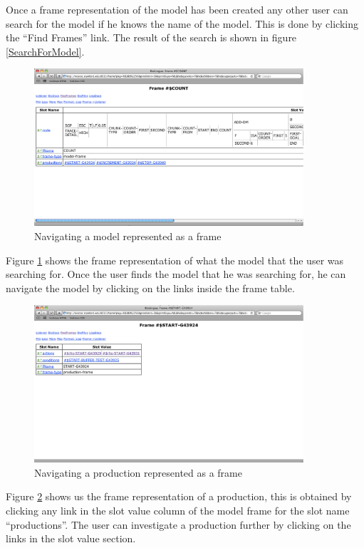 Once a frame representation of the model has been created any other
user can search for the model if he knows the name of the model. This
is done by clicking the ``Find Frames'' link. The result of the search
is shown in figure \ref{SearchForModel}.

\begin{figure}[htp]
  \centering
  \includegraphics[width=100mm]{NavigateFrame}
  \caption{Navigating a model represented as a frame}
  \label{NavigateFrame}
\end{figure}

Figure \ref{NavigateFrame} shows the frame representation of what the
model that the user was searching for. Once the user finds the model
that he was searching for, he can navigate the model by clicking on
the links inside the frame table.

\begin{figure}[htp]
  \centering
  \includegraphics[width=100mm]{NavigatingAProduction}
  \caption{Navigating a production represented as a frame}
  \label{NavigatingAProduction}
\end{figure}

Figure \ref{NavigatingAProduction} shows us the frame representation
of a production, this is obtained by clicking any link in the slot
value column of the model frame for the slot name ``productions''. The
user can investigate a production further by clicking on the links in
the slot value section. 

